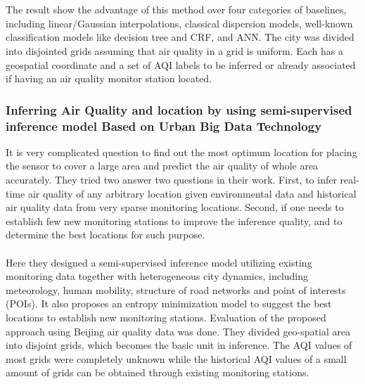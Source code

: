 \\
\\
The result show the advantage of this method over four categories of baselines, including linear/Gaussian interpolations, classical dispersion models, well-known classification models like decision tree and CRF, and ANN. The city was divided into disjointed grids assuming that air quality in a grid is uniform. Each has a geospatial coordinate and a set of AQI labels to be inferred or already associated if having an air quality monitor station located.

\subsubsection{Inferring Air Quality and location by using semi-supervised inference model Based on Urban Big Data Technology}
It is very complicated question to find out the most optimum location for placing the sensor to cover a large area and predict the air quality of whole area accurately. They tried two answer two questions in their work. First, to infer real-time air quality of any arbitrary location given environmental data and historical air quality data from very sparse monitoring locations. Second, if one needs to establish few new monitoring stations to improve the inference quality, and to determine the best locations for such purpose.
\\
\\
Here they designed a semi-supervised inference model utilizing existing monitoring data together with heterogeneous city dynamics, including meteorology, human mobility, structure of road networks and point of interests (POIs). It also proposes an entropy minimization model to suggest the best locations to establish new monitoring stations. Evaluation of the proposed approach using Beijing air quality data was done. They divided geo-spatial area into disjoint grids, which becomes the basic unit in inference. The AQI values of most grids were completely unknown while the historical AQI values of a small amount of grids can be obtained through existing monitoring stations.

